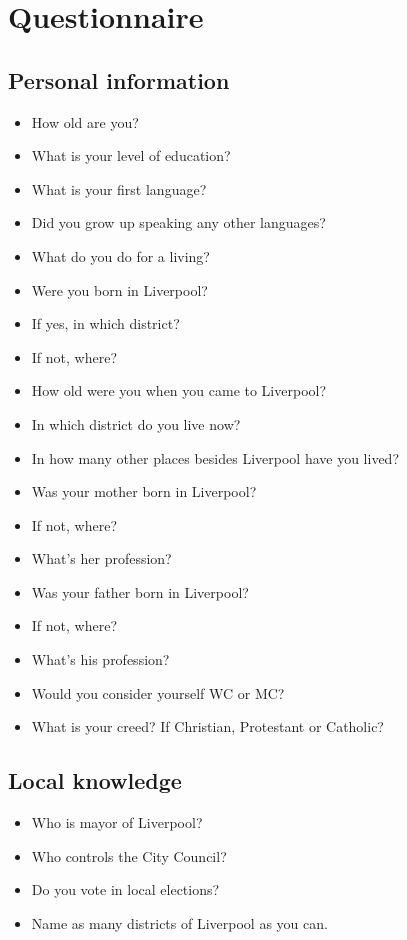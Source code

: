 \chapter{Questionnaire}
	\label{app.questionnaire}
	
	\section*{Personal information}
		\begin{multicols}{2}
		\begin{itemize}
			\item How old are you?
			\item What is your level of education? 
			\item What is your first language?
			\item Did you grow up speaking any other languages?
			\item What do you do for a living?
			\item Were you born in Liverpool?
			\item If yes, in which district?
			\item If not, where?
			\item How old were you when you came to Liverpool?
			\item In which district do you live now?
			\item In how many other places besides Liverpool have you lived?
			\item Was your mother born in Liverpool?
			\item If not, where?
			\item What's her profession?
			\item Was your father born in Liverpool?
			\item If not, where?
			\item What's his profession?
			\item Would you consider yourself WC or MC?
			\item What is your creed? If Christian, Protestant or Catholic?
		\end{itemize}
	\end{multicols}
	
	\section*{Local knowledge}
	\begin{multicols}{2}
		\begin{itemize}
			\item Who is mayor of Liverpool?
			\item Who controls the City Council?
			\item Do you vote in local elections?
			\item Name as many districts of Liverpool as you can.
		\end{itemize}
	\end{multicols}
	
